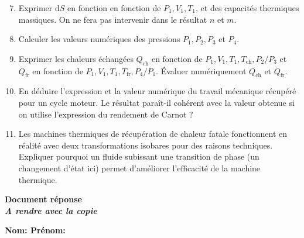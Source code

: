 \documentclass[a4paper, 12pt, garamond]{book}
\begin{document}
\begin{enumerate}
	\setcounter{enumi}{6}
	\item
	      Exprimer \(\mathrm{d}S\) en fonction en fonction de
	      \(P_1 , V_1, T_1\), et des capacités thermiques massiques. On ne fera
	      pas intervenir dans le résultat \(n\) et \(m\).
	\item
	      Calculer les valeurs numériques des pressions \(P_1,P_2,P_3\) et
	      \(P_4\).
	\item
	      Exprimer les chaleurs échangées \(Q_\mathrm{ch}\) en fonction de
	      \(P_1 , V_1, T_1, T_\mathrm{ch}, P_2/P_3\) et \(Q_\mathrm{fr}\) en
	      fonction de \(P_1 , V_1 , T_1, T_\mathrm{fr} , P_4/P_1\). Évaluer
	      numériquement \(Q_\mathrm{ch}\) et \(Q_\mathrm{fr}\).
	\item
	      En déduire l'expression et la valeur numérique du travail mécanique
	      récupéré pour un cycle moteur. Le résultat paraît-il cohérent avec la
	      valeur obtenue si on utilise l'expression du rendement de Carnot ?
	\item
	      Les machines thermiques de récupération de chaleur fatale fonctionnent
	      en réalité avec deux transformations isobares pour des raisons
	      techniques. Expliquer pourquoi un fluide subissant une transition de
	      phase (un changement d'état ici) permet d'améliorer l'efficacité de la
	      machine thermique.
\end{enumerate}

\newpage

\begin{tcolorbox}
	\centering\huge{\textbf{Document réponse \\\emph{A rendre avec la copie}}}
\end{tcolorbox}

\textbf{Nom: \hspace{7cm} Prénom:}\\
\end{document}
